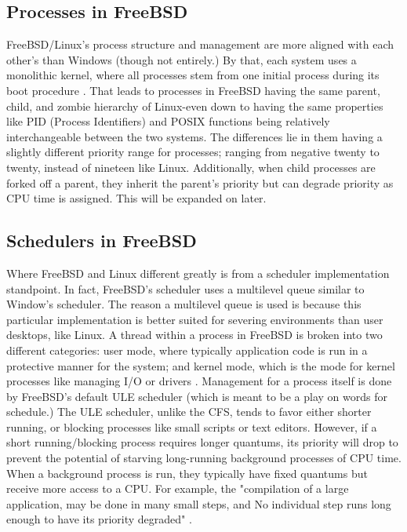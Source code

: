 \subsection{Processes in FreeBSD}
FreeBSD/Linux’s process structure and management are more aligned with each other's than Windows (though not entirely.) By that, each system uses a monolithic kernel, where all processes stem from one initial process during its boot procedure \cite{freeBsdBook}. That leads to  processes in FreeBSD having the same parent, child, and zombie hierarchy of Linux-even down to having the same properties like PID (Process Identifiers) and POSIX functions being relatively interchangeable between the two systems. The differences lie in them having a slightly different priority range for processes; ranging from negative twenty to twenty, instead of nineteen like Linux\cite{setprior86:online}. Additionally, when child processes are forked off a parent, they inherit the parent's priority but can degrade priority as CPU time is assigned. This will be expanded on later.
\subsection{Schedulers in FreeBSD}
Where FreeBSD and Linux different greatly is from a scheduler implementation standpoint. In fact, FreeBSD's scheduler uses a multilevel queue\cite{ThreadSc37:online} similar to Window’s scheduler. The reason a multilevel queue is used is because this particular implementation is better suited for severing environments than user desktops, like Linux. A thread within a process in FreeBSD is broken into two different categories: user mode, where typically application code is run in a protective manner for the system; and kernel mode, which is the mode for kernel processes like managing I/O or drivers \cite{freeBsdBook}. Management for a process itself is done by FreeBSD’s default ULE scheduler (which is meant to be a play on words for schedule.) The ULE scheduler, unlike the CFS, tends to favor either shorter running, or blocking processes like small scripts or text editors. However, if a short running/blocking process requires longer quantums, its priority will drop to prevent the potential of starving long-running background processes of CPU time. When a background process is run, they typically have fixed quantums but receive more access to a CPU. For example, the "compilation of a large application, may be done in many small steps, and  No individual step runs long enough to have its priority degraded" \cite{freeBsdBook}.
